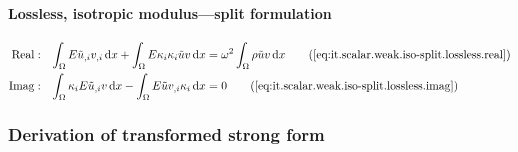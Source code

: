 \paragraph{Lossless, isotropic modulus---split formulation}
%
\begin{align*}
    \mathrm{Real:}& & \int_{\Omega} {
        E \kernel{u}_{,i} v_{,i} \dx
    } + \int_{\Omega} {
        E \wavenum_{i} \wavenum_{i} \kernel{u} v \dx
    } &= \omega^2 \int_{\Omega} {
        \rho \kernel{u} v \dx
    } \tag{\ref{eq:it.scalar.weak.iso-split.lossless.real}} \\
    \mathrm{Imag:}& & \int_{\Omega} {
        \wavenum_{i} E \kernel{u}_{,i} v \dx
    } - \int_{\Omega} {
        E \kernel{u} v_{,i} \wavenum_{i} \dx
    } &= 0 \tag{\ref{eq:it.scalar.weak.iso-split.lossless.imag}}
\end{align*}


\subsubsection{Derivation of transformed strong form}
\label{sec:it.scalar.strong-derivation}

